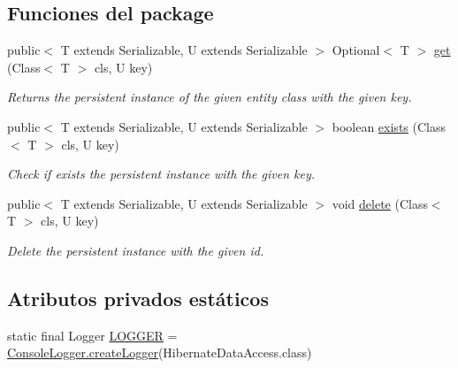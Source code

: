 \subsection*{Funciones del \textquotesingle{}package\textquotesingle{}}
\begin{DoxyCompactItemize}
\item 
public$<$ T extends Serializable, U extends Serializable $>$ Optional$<$ T $>$ \mbox{\hyperlink{classcom_1_1ruralhousejsf_1_1data_access_1_1_hibernate_data_access_a0620c099395860e9df083998f4f73f7d}{get}} (Class$<$ T $>$ cls, U key)
\begin{DoxyCompactList}\small\item\em Returns the persistent instance of the given entity class with the given key. \end{DoxyCompactList}\item 
public$<$ T extends Serializable, U extends Serializable $>$ boolean \mbox{\hyperlink{classcom_1_1ruralhousejsf_1_1data_access_1_1_hibernate_data_access_a0f782c671d6feb48f69a3128fe5e3484}{exists}} (Class$<$ T $>$ cls, U key)
\begin{DoxyCompactList}\small\item\em Check if exists the persistent instance with the given key. \end{DoxyCompactList}\item 
public$<$ T extends Serializable, U extends Serializable $>$ void \mbox{\hyperlink{classcom_1_1ruralhousejsf_1_1data_access_1_1_hibernate_data_access_a4f8656939c9f559fa536850957dce8ce}{delete}} (Class$<$ T $>$ cls, U key)
\begin{DoxyCompactList}\small\item\em Delete the persistent instance with the given id. \end{DoxyCompactList}\end{DoxyCompactItemize}
\subsection*{Atributos privados estáticos}
\begin{DoxyCompactItemize}
\item 
static final Logger \mbox{\hyperlink{classcom_1_1ruralhousejsf_1_1data_access_1_1_hibernate_data_access_a3f050c37956274b82491f5fcf9ce5db1}{L\+O\+G\+G\+ER}} = \mbox{\hyperlink{classcom_1_1ruralhousejsf_1_1logger_1_1_console_logger_a520321643663e37d95761134a35505cd}{Console\+Logger.\+create\+Logger}}(Hibernate\+Data\+Access.\+class)
\end{DoxyCompactItemize}


